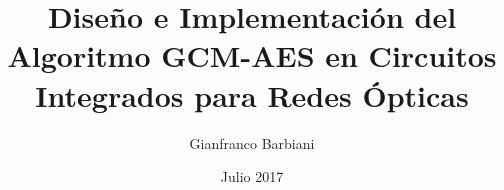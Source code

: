 \label{ch:title}
\titlehead{Tesis presentada para el Título de de Grado en Ingeniería en Computación}
\title{Diseño e Implementación del Algoritmo GCM-AES en Circuitos Integrados para Redes Ópticas}
\author{Gianfranco Barbiani}
\date{Julio 2017}
\publishers{
	Escuela de Computación\\
	Facultad de Ciencias Exactas, Físicas y Naturales\\
	Universidad de Córdoba\\
	\texttt{[image: unc\_logo.png]}
	\texttt{[image: fcefyn\_logo.png]}
}